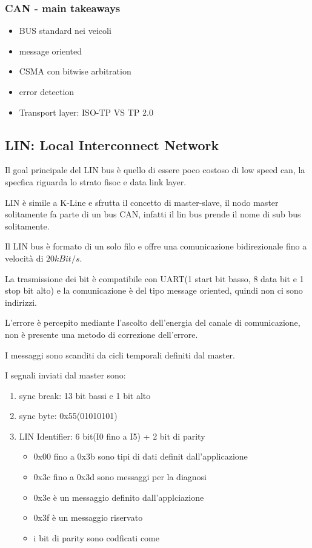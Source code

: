\subsubsection{CAN - main takeaways}

\begin{itemize}
  \item BUS standard nei veicoli
  \item message oriented
  \item CSMA con bitwise arbitration
  \item error detection
  \item Transport layer: ISO-TP VS TP 2.0
\end{itemize}

\subsection{LIN: Local Interconnect Network} %
\label{sub:LIN: Local Interconnect Network}

Il goal principale del LIN bus è quello di essere poco costoso di low speed can, la specfica riguarda
lo strato fisoc e data link layer.

LIN è simile a K-Line e sfrutta il concetto di master-slave, il nodo master solitamente
fa parte di un bus CAN, infatti il lin bus prende il nome di sub bus solitamente.

Il LIN bus è formato di un solo filo e offre una comunicazione bidirezionale fino a velocità
di $20kBit/s$.

La trasmissione dei bit è compatibile con UART(1 start bit basso, 8 data bit e 1 stop bit alto) e la comunicazione è del tipo message oriented, quindi non ci sono indirizzi.


L'errore è percepito mediante l'ascolto dell'energia del canale di comunicazione, non è presente una metodo di correzione dell'errore.

I messaggi sono scanditi da cicli temporali definiti dal master.

I segnali inviati dal master sono:
\begin{enumerate}
  \item sync break: 13 bit bassi e 1 bit alto
  \item sync byte: 0x55(01010101)
  \item LIN Identifier: 6 bit(I0 fino a I5) + 2 bit di parity
    \begin{itemize}
      \item 0x00 fino a 0x3b sono tipi di dati definit dall'applicazione
      \item 0x3c fino a 0x3d sono messaggi per la diagnosi
      \item 0x3e è un messaggio definito dall'applciazione
      \item 0x3f è un messaggio riservato
      \item i bit di parity sono codficati come %
    \end{itemize}
\end{enumerate}



